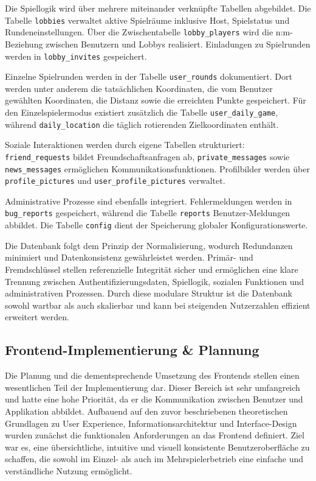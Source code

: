 Die Spiellogik wird über mehrere miteinander verknüpfte Tabellen abgebildet. 
Die Tabelle \texttt{lobbies} verwaltet aktive Spielräume inklusive Host, Spielstatus und Rundeneinstellungen. 
Über die Zwischentabelle \texttt{lobby\_players} wird die n:m-Beziehung zwischen Benutzern und Lobbys realisiert. 
Einladungen zu Spielrunden werden in \texttt{lobby\_invites} gespeichert.

Einzelne Spielrunden werden in der Tabelle \texttt{user\_rounds} dokumentiert. 
Dort werden unter anderem die tatsächlichen Koordinaten, die vom Benutzer gewählten Koordinaten, die Distanz sowie die erreichten Punkte gespeichert. 
Für den Einzelspielermodus existiert zusätzlich die Tabelle \texttt{user\_daily\_game}, während \texttt{daily\_location} die täglich rotierenden Zielkoordinaten enthält.

Soziale Interaktionen werden durch eigene Tabellen strukturiert: 
\texttt{friend\_requests} bildet Freundschaftsanfragen ab, \texttt{private\_messages} sowie \texttt{news\_messages} ermöglichen Kommunikationsfunktionen. 
Profilbilder werden über \texttt{profile\_pictures} und \texttt{user\_profile\_pictures} verwaltet.

Administrative Prozesse sind ebenfalls integriert. 
Fehlermeldungen werden in \texttt{bug\_reports} gespeichert, während die Tabelle \texttt{reports} Benutzer-Meldungen abbildet. 
Die Tabelle \texttt{config} dient der Speicherung globaler Konfigurationswerte.

Die Datenbank folgt dem Prinzip der Normalisierung, wodurch Redundanzen minimiert und Datenkonsistenz gewährleistet werden. 
Primär- und Fremdschlüssel stellen referenzielle Integrität sicher und ermöglichen eine klare Trennung zwischen Authentifizierungsdaten, Spiellogik, sozialen Funktionen und administrativen Prozessen. 
Durch diese modulare Struktur ist die Datenbank sowohl wartbar als auch skalierbar und kann bei steigenden Nutzerzahlen effizient erweitert werden.

\subsection{Frontend-Implementierung \& Plannung}
Die Planung und die dementsprechende Umsetzung des Frontends stellen einen wesentlichen Teil der Implementierung dar. Dieser Bereich ist sehr umfangreich und hatte eine hohe Priorität, da er die Kommunikation zwischen Benutzer und Applikation abbildet. Aufbauend auf den zuvor beschriebenen theoretischen Grundlagen zu User Experience, Informationsarchitektur und Interface-Design wurden zunächst die funktionalen Anforderungen an das Frontend definiert. Ziel war es, eine übersichtliche, intuitive und visuell konsistente Benutzeroberfläche zu schaffen, die sowohl im Einzel- als auch im Mehrspielerbetrieb eine einfache und verständliche Nutzung ermöglicht.

